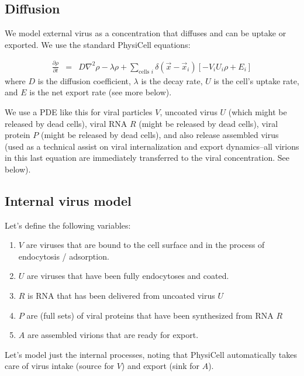 \documentclass[12point]{article}
\begin{document}
\subsection{Diffusion}
We model external virus as a concentration that diffuses and can be uptake or exported. We use the standard PhysiCell equations: 

\begin{eqnarray}
\frac{\partial \rho }{\partial t} & = & 
D \nabla^2 \rho - \lambda \rho + 
\sum_{\textrm{cells }i} 
\delta( \vec{x} - \vec{x}_i ) \left[ 
-V_i U_i \rho + E_i 
\right]
\end{eqnarray}
where $D$ is the diffusion coefficient, $\lambda$ is the decay rate, $U$ is the cell's uptake rate, and $E$ is the net export rate (see more below). 

We use a PDE like this for viral particles $V$, uncoated virus $U$ (which might be released by dead cells), viral RNA $R$ (might be released by dead cells), viral protein $P$ (might be released by dead cells), and also 
release assembled virus (used as a technical assist on viral internalization and export dynamics--all virions in this last equation are immediately transferred to the viral concentration. See below). 

\subsection{Internal virus model}
Let's define the following variables: 
\begin{enumerate}
\item 
$V$ are viruses that are bound to the cell surface and in the process of endocytosis / adsorption. 

\item 
$U$ are viruses that have been fully endocytoses and coated. 

\item 
$R$ is RNA that has been delivered from uncoated virus $U$

\item 
$P$ are (full sets) of viral proteins that have been synthesized from RNA $R$

\item 
$A$ are assembled virions that are ready for export. 

\end{enumerate}
Let's model just the internal processes, noting that PhysiCell automatically takes care of virus intake (source for $V$) and export (sink for $A$). 
\end{document}

